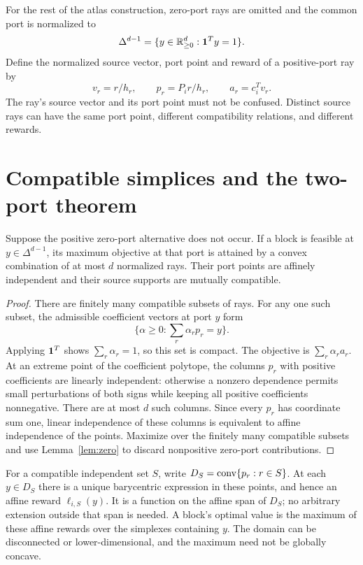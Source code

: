 For the rest of the atlas construction, zero-port rays are omitted and the common port is normalized to
\[
 \Delta^{d-1}=\{y\in\mathbb R^d_{\ge0}:\mathbf1^Ty=1\}.
\]
Define the normalized source vector, port point and reward of a positive-port ray by
\begin{equation}
 v_r=r/h_r,\qquad p_r=P_i r/h_r,\qquad a_r=c_i^Tv_r.
 \label{eq:normalize}
\end{equation}
The ray's source vector and its port point must not be confused. Distinct source rays can have the same port point, different compatibility relations, and different rewards.

\section{Compatible simplices and the two-port theorem}
\label{sec:two}

\begin{lemma}
\label{lem:simplex}
Suppose the positive zero-port alternative does not occur. If a block is feasible at $y\in\Delta^{d-1}$, its maximum objective at that port is attained by a convex combination of at most $d$ normalized rays. Their port points are affinely independent and their source supports are mutually compatible.
\end{lemma}
\begin{proof}
There are finitely many compatible subsets of rays. For any one such subset, the admissible coefficient vectors at port $y$ form
\[
 \{\alpha\ge0:\sum_r\alpha_rp_r=y\}.
\]
Applying $\mathbf1^T$ shows $\sum_r\alpha_r=1$, so this set is compact. The objective is $\sum_r\alpha_ra_r$. At an extreme point of the coefficient polytope, the columns $p_r$ with positive coefficients are linearly independent: otherwise a nonzero dependence permits small perturbations of both signs while keeping all positive coefficients nonnegative. There are at most $d$ such columns. Since every $p_r$ has coordinate sum one, linear independence of these columns is equivalent to affine independence of the points. Maximize over the finitely many compatible subsets and use Lemma~\ref{lem:zero} to discard nonpositive zero-port contributions.
\end{proof}

For a compatible independent set $S$, write $D_S=\operatorname{conv}\{p_r:r\in S\}$. At each $y\in D_S$ there is a unique barycentric expression in these points, and hence an affine reward $\ell_{i,S}(y)$. It is a function on the affine span of $D_S$; no arbitrary extension outside that span is needed. A block's optimal value is the maximum of these affine rewards over the simplexes containing $y$. The domain can be disconnected or lower-dimensional, and the maximum need not be globally concave.

